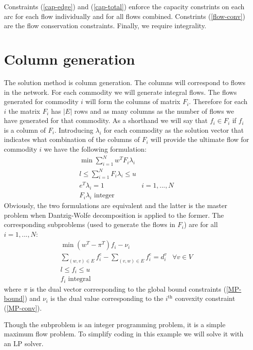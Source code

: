\documentclass{article}
\begin{document}
Constraints (\ref{cap-edge}) and (\ref{cap-total}) enforce the capacity
constrints on each arc for each flow individually and for all flows combined.
Constrints (\ref{flow-conv}) are the flow conservation constraints. Finally,
we require integrality.

\section{Column generation}
The solution method is column generation. The columns will correspond to flows
in the network. For each commodity we will generate integral flows. The flows
generated for commodity $i$ will form the columns of matrix $F_i$. Therefore
for each $i$ the matrix $F_i$ has $|E|$ rows and as many columns as the number
of flows we have generated for that commodity. As a shorthand we will say that
$f_i \in F_i$ if $f_i$ is a column of $F_i$. Introducing $\lambda_i$ for each
commodity as the solution vector that indicates what combination of the
columns of $F_i$ will provide the ultimate flow for commodity $i$ we have the
following formulation:
\begin{eqnarray}[r:l]
\min\sum_{i=1}^Nw^TF_i\lambda_i
& \nonumber \\
l \le\sum_{i=1}^NF_i\lambda_i\le u 
& \label{MP-bound} \\
e^T\lambda_i = 1 & 
i=1,...,N \label{MP-conv}\\
F_i\lambda_i \textrm{\ integer} 
& 
\end{eqnarray}
Obviously, the two formulations are equivalent and the latter is the master
problem when Dantzig-Wolfe decomposition is applied to the former. The
corresponding subproblems (used to generate the flows in $F_i$) are for all
$i=1,...,N$:
\begin{eqnarray}[l:r]
\min(w^T-\pi^T)f_i-\nu_i & \nonumber \\
\sum_{(w,v)\in E}f^e_i - \sum_{(v,w)\in E}f^e_i = d^v_i 
& \forall v\in V \label{MP-flow-conv}\\
l \le f_i \le u & \\
f_i \textrm{\ integral} &
\end{eqnarray}
where $\pi$ is the dual vector corresponding to the global bound constraints
(\ref{MP-bound}) and $\nu_i$ is the dual value corresponding to the
$i^\textrm{th}$ convexity constraint (\ref{MP-conv}).

Though the subproblem is an integer programming problem, it is a simple
maximum flow problem. To simplify coding in this example we will solve it with
an LP solver.
\end{document}
